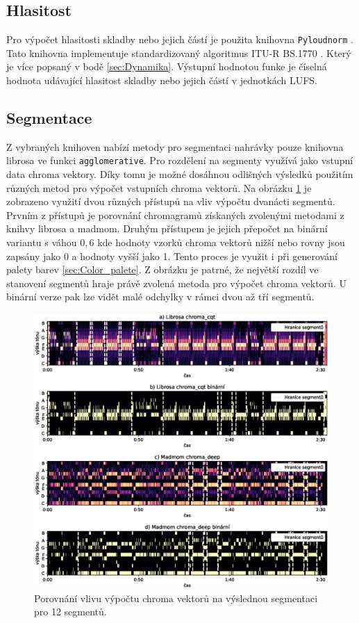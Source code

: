 \subsection{Hlasitost} \label{sec:Pyloudnorm}
Pro výpočet hlasitosti skladby nebo jejich částí je použita knihovna \texttt{Pyloudnorm} \cite{Pyloudnorm}. Tato knihovna implementuje standardizovaný algoritmus ITU-R BS.1770 \cite{BS.1770}. Který je více popsaný v bodě \ref{sec:Dynamika}. Výstupní hodnotou funke je číselná hodnota udávající hlasitost skladby nebo jejich částí v jednotkách LUFS. 

\subsection{Segmentace} \label{sec:Segmentace}
Z vybraných knihoven nabízí metody pro segmentaci nahrávky pouze knihovna librosa ve funkci \texttt{agglomerative}. Pro rozdělení na segmenty využívá jako vstupní data chroma vektory. Díky tomu je možné dosáhnou odlišných výsledků použitím různých metod pro výpočet vstupních chroma vektorů. Na obrázku \ref{fig:Segmentation_chroma_comparison} je zobrazeno využití dvou různých přístupů na vliv výpočtu dvanácti segmentů. Prvním z přístupů je porovnání chromagramů získaných zvolenými metodami z knihvy librosa a madmom. Druhým přístupem je jejich přepočet na binární variantu s váhou  $0,6$ kde hodnoty vzorků chroma vektorů nižší nebo rovny jsou zapsány jako 0 a hodnoty vyšší jako 1. Tento proces je využit i při generování palety barev \ref{sec:Color_palete}. Z obrázku je patrné, že největší rozdíl ve stanovení segmentů hraje právě zvolená metoda pro výpočet chroma vektorů. U binární verze pak lze vidět malé odchylky v rámci dvou až tří segmentů. 

\begin{figure}[H]
    \centering
    \includegraphics[width = 1\linewidth]{obrazky/Segmentation_chroma_comparisons.eps}
    \caption{Porovnání vlivu výpočtu chroma vektorů na výslednou segmentaci pro 12 segmentů.}
    \label{fig:Segmentation_chroma_comparison}
\end{figure}

